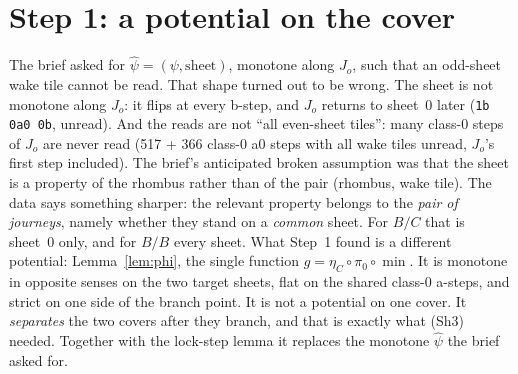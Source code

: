 \documentclass[11pt]{article}
\theoremstyle{definition}\newtheorem{definition}[theorem]{Definition}\newtheorem{remark}[theorem]{Remark}
\begin{document}
\section{Step 1: a potential on the cover}\label{sec:step1}
The brief asked for $\hat\psi=(\psi,\mathrm{sheet})$, monotone along $J_o$, such that an odd-sheet wake tile cannot be read. That shape turned out to be wrong. The sheet is not monotone along $J_o$: it flips at every b-step, and $J_o$ returns to sheet~0 later (\texttt{1b 0a0 0b}, unread). And the reads are not ``all even-sheet tiles'': many class-0 steps of $J_o$ are never read (517 + 366 class-0 a0 steps with all wake tiles unread, $J_o$'s first step included).
The brief's anticipated broken assumption was that the sheet is a property of the rhombus rather than of the pair (rhombus, wake tile). The data says something sharper: the relevant property belongs to the \emph{pair of journeys}, namely whether they stand on a \emph{common} sheet. For $B/C$ that is sheet~0 only, and for $B/B$ every sheet.
What Step~1 found is a different potential: Lemma~\ref{lem:phi}, the single function $g=\eta_C\circ\pi_0\circ\min$. It is monotone in opposite senses on the two target sheets, flat on the shared class-0 a-steps, and strict on one side of the branch point. It is not a potential on one cover. It \emph{separates} the two covers after they branch, and that is exactly what (Sh3) needed. Together with the lock-step lemma it replaces the monotone $\hat\psi$ the brief asked for.
\end{document}
